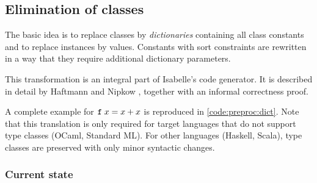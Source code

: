 \subsection{Elimination of classes}
\label{sec:preproc:dict:elim}
The basic idea is to replace classes by \emph{dictionaries} containing all class constants and to replace instances by values.
Constants with sort constraints are rewritten in a way that they require additional dictionary parameters.

This transformation is an integral part of Isabelle's code generator.
It is described in detail by Haftmann and Nipkow \cite[§4]{haftmann2010codegeneration}, together with an informal correctness proof.


A complete example for $\texttt{\textup{f}}\;x = x + x$ is reproduced in \cref{code:preproc:dict}.
Note that this translation is only required for target languages that do not support type classes (OCaml, Standard ML).
For other languages (Haskell, Scala), type classes are preserved with only minor syntactic changes.

\subsubsection{Current state}
\label{sec:preproc:dict:current}


